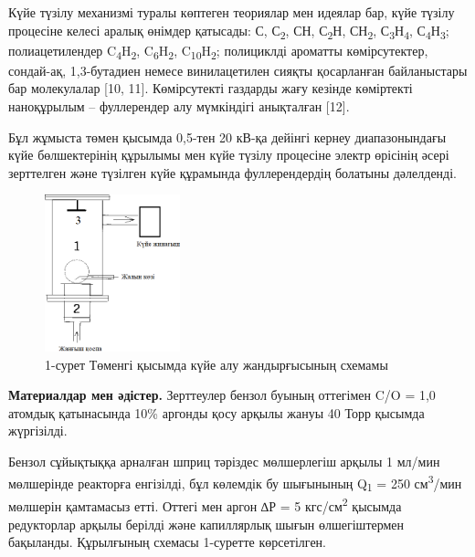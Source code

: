 \begin{multicols}{2}
Күйе түзілу механизмі туралы көптеген теориялар мен идеялар бар, күйе
түзілу процесіне келесі аралық өнімдер қатысады: С, С\textsubscript{2},
СН, С\textsubscript{2}Н, СН\textsubscript{2},
С\textsubscript{3}Н\textsubscript{4},
С\textsubscript{4}Н\textsubscript{3}; полиацетилендер
C\textsubscript{4}H\textsubscript{2},
C\textsubscript{6}H\textsubscript{2},
C\textsubscript{10}H\textsubscript{2}; полициклді ароматты
көмірсутектер, сондай-ақ, 1,3-бутадиен немесе винилацетилен сияқты
қосарланған байланыстары бар молекулалар {[}10, 11{]}. Көмірсутекті
газдарды жағу кезінде көміртекті наноқұрылым -- фуллерендер алу
мүмкіндігі анықталған {[}12{]}.

Бұл жұмыста төмен қысымда 0,5-тен 20 кВ-қа дейінгі кернеу диапазонындағы
күйе бөлшектерінің құрылымы мен күйе түзілу процесіне электр өрісінің
әсері зерттелген және түзілген күйе құрамында фуллерендердің болатыны
дәлелденді.

\begin{figure}[H]
	\centering
	\includegraphics[width=0.35\textwidth]{assets/23}
	\caption*{1-сурет Төменгі қысымда күйе алу жандырғысының схемамы}
\end{figure}

{\bfseries Материалдар мен әдістер.} Зерттеулер бензол буының оттегімен C/O
= 1,0 атомдық қатынасында 10\% аргонды қосу арқылы жануы 40 Торр қысымда
жүргізілді.

Бензол сұйықтыққа арналған шприц тәріздес мөлшерлегіш арқылы 1 мл/мин
мөлшерінде реакторға енгізілді, бұл көлемдік бу шығынының
Q\textsubscript{1} = 250 см\textsuperscript{3}/мин мөлшерін қамтамасыз
етті. Оттегі мен аргон ∆Р = 5 кгс/см\textsuperscript{2} қысымда
редукторлар арқылы берілді және капиллярлық шығын өлшегіштермен
бақыланды. Құрылғының схемасы 1-суретте көрсетілген.


\end{multicols}
